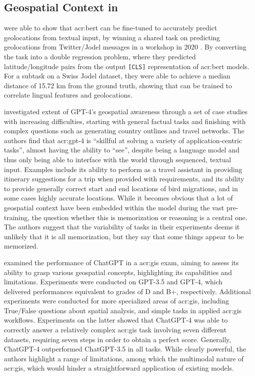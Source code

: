 \subsection[Geospatial Context in LLMs]{Geospatial Context in }

\cite{scherrerHeLjuVarDial20202020} were able to show that \acrshort{acr:bert} can be fine-tuned to accurately predict geolocations from textual input, by winning a shared task on predicting geolocations from Twitter/Jodel messages in a workshop in 2020 \citep{gamanReportVarDialEvaluation2020}. By converting the task into a double regression problem, where they predicted latitude/longitude pairs from the output \texttt{[CLS]} representation of \acrshort{acr:bert} models. For a subtask on a Swiss Jodel dataset, they were able to achieve a median distance of 15.72 km from the ground truth, showing that  can be trained to correlate lingual features and geolocations.

\cite{robertsGPT4GEOHowLanguage2023} investigated extent of GPT-4's geospatial awareness through a set of case studies with increasing difficulties, starting with general factual tasks and finishing with complex questions such as generating country outlines and travel networks. The authors find that \acrshort{acr:gpt}-4 is \enquote{skillful at solving a variety of application-centric tasks}, almost having the ability to \enquote{see}, despite being a language model and thus only being able to interface with the world through sequenced, textual input. Examples include its ability to perform as a travel assistant in providing itinerary suggestions for a trip when provided with requirements, and its ability to provide generally correct start and end locations of bird migrations, and in some cases highly accurate locations. While it becomes obvious that a lot of geospatial context have been embedded within the model during the vast pre-training, the question whether this is memorization or reasoning is a central one. The authors suggest that the variability of tasks in their experiments deems it unlikely that it is all memorization, but they say that some things appear to be memorized.

\cite{mooneyUnderstandingGeospatialSkills2023} examined the performance of ChatGPT in a \acrfull{acr:gis} exam, aiming to assess its ability to grasp various geospatial concepts, highlighting its capabilities and limitations. Experiments were conducted on GPT-3.5 and GPT-4, which delivered performances equivalent to grades of D and B+, respectively. Additional experiments were conducted for more specialized areas of \acrshort{acr:gis}, including True/False questions about spatial analysis, and simple tasks in applied \acrshort{acr:gis} workflows. Experiments on the latter showed that ChatGPT-4 was able to correctly answer a relatively complex \acrshort{acr:gis} task involving seven different datasets, requiring seven steps in order to obtain a perfect score. Generally, ChatGPT-4 outperformed ChatGPT-3.5 in all tasks. While clearly powerful, the authors highlight a range of limitations, among which the multimodal nature of \acrshort{acr:gis}, which would hinder a straightforward application of existing models.


